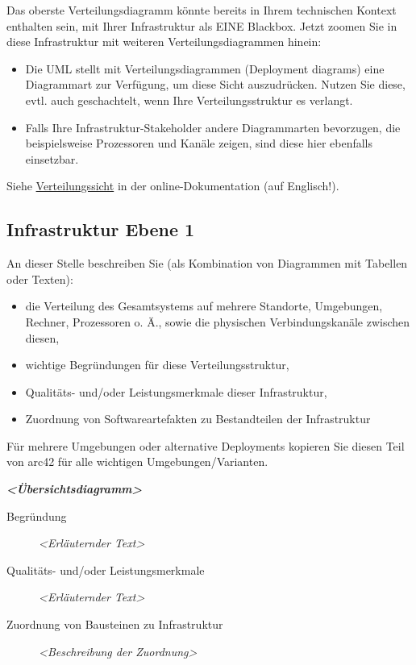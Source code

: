 \documentclass[
]{article}
\begin{document}
Das oberste Verteilungsdiagramm könnte bereits in Ihrem technischen
Kontext enthalten sein, mit Ihrer Infrastruktur als EINE Blackbox. Jetzt
zoomen Sie in diese Infrastruktur mit weiteren Verteilungsdiagrammen
hinein:

\begin{itemize}
\item
  Die UML stellt mit Verteilungsdiagrammen (Deployment diagrams) eine
  Diagrammart zur Verfügung, um diese Sicht auszudrücken. Nutzen Sie
  diese, evtl. auch geschachtelt, wenn Ihre Verteilungsstruktur es
  verlangt.
\item
  Falls Ihre Infrastruktur-Stakeholder andere Diagrammarten bevorzugen,
  die beispielsweise Prozessoren und Kanäle zeigen, sind diese hier
  ebenfalls einsetzbar.
\end{itemize}

Siehe \href{https://docs.arc42.org/section-7/}{Verteilungssicht} in der
online-Dokumentation (auf Englisch!).

\hypertarget{_infrastruktur_ebene_1}{%
\subsection{Infrastruktur Ebene 1}\label{_infrastruktur_ebene_1}}

An dieser Stelle beschreiben Sie (als Kombination von Diagrammen mit
Tabellen oder Texten):

\begin{itemize}
\item
  die Verteilung des Gesamtsystems auf mehrere Standorte, Umgebungen,
  Rechner, Prozessoren o. Ä., sowie die physischen Verbindungskanäle
  zwischen diesen,
\item
  wichtige Begründungen für diese Verteilungsstruktur,
\item
  Qualitäts- und/oder Leistungsmerkmale dieser Infrastruktur,
\item
  Zuordnung von Softwareartefakten zu Bestandteilen der Infrastruktur
\end{itemize}

Für mehrere Umgebungen oder alternative Deployments kopieren Sie diesen
Teil von arc42 für alle wichtigen Umgebungen/Varianten.

\emph{\textbf{\textless Übersichtsdiagramm\textgreater{}}}

\begin{description}
\item[Begründung]
\emph{\textless Erläuternder Text\textgreater{}}
\item[Qualitäts- und/oder Leistungsmerkmale]
\emph{\textless Erläuternder Text\textgreater{}}
\item[Zuordnung von Bausteinen zu Infrastruktur]
\emph{\textless Beschreibung der Zuordnung\textgreater{}}
\end{description}
\end{document}
